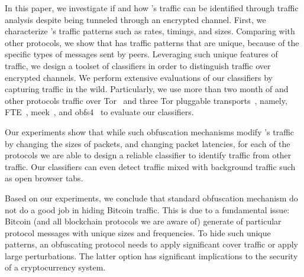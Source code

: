 In this paper, we investigate if and how  \bc's traffic can be identified through traffic analysis despite being tunneled through an encrypted channel. 
First, we characterize \bc's traffic patterns such as rates, timings, and sizes. 
Comparing with other protocols, we show that \bc has traffic patterns that are unique, because of the specific types of messages sent by \bc peers. 
Leveraging such unique features of \bc traffic, we design a toolset of classifiers in order to distinguish \bc traffic over encrypted channels. 
We perform extensive evaluations of our classifiers by capturing \bc traffic in the wild. Particularly, we use more than two month of \bc  and other protocols traffic over Tor~\cite{tor} and three Tor pluggable transports~\cite{pluggable-transport}, namely, FTE~\cite{fte}, meek~\cite{meek}, and obfs4~\cite{obfsproxy} to evaluate our classifiers.%

Our experiments show that while such obfuscation mechanisms modify \bc's traffic by changing the sizes of packets, and changing packet latencies, for each of the protocols we are able to design a reliable classifier to identify \bc traffic from other traffic. 
Our classifiers can even detect \bc traffic mixed with background traffic such as open browser tabs.


Based on our experiments, we conclude that standard obfuscation mechanism do not do a good job in hiding Bitcoin traffic. 
This is due to a fundamental issue: Bitcoin (and all blockchain protocols we are aware of) generate of particular protocol messages with unique sizes and frequencies. To hide such unique patterns, an obfuscating protocol needs to apply significant cover traffic or apply large perturbations. 
The latter option has significant implications to the security of a cryptocurrency system.

